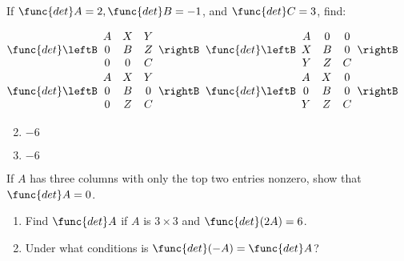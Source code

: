 \begin{multicols}{2}
\begin{ex}
If $\func{det } A = 2, \func{det } B = -1$, and $\func{det } C = 3$, find:

\begin{exenumerate}
\exitem $\func{det} \leftB \begin{array}{ccc}
A & X & Y \\
0 & B & Z \\
0 & 0 & C
\end{array}\rightB$
\exitem $\func{det} \leftB \begin{array}{ccc}
A & 0 & 0 \\
X & B & 0 \\
Y & Z & C
\end{array}\rightB$
\exitem $\func{det} \leftB \begin{array}{ccc}
A & X & Y \\
0 & B & 0 \\
0 & Z & C
\end{array}\rightB$
\exitem $\func{det} \leftB \begin{array}{ccc}
A & X & 0 \\
0 & B & 0 \\
Y & Z & C
\end{array}\rightB$
\end{exenumerate}
\begin{sol}
\begin{enumerate}[label={\alph*.}]
\setcounter{enumi}{1}
\item  $-6$

\setcounter{enumi}{3}
\item  $-6$

\end{enumerate}
\end{sol}
\end{ex}

\begin{ex}
If $A$ has three columns with only the top two entries nonzero, show that $\func{det } A = 0$.
\end{ex}

\begin{ex}
\begin{enumerate}[label={\alph*.}]
\item Find $\func{det } A$ if $A$ is $3 \times 3$ and $\func{det}(2A) = 6$.

\item Under what conditions is $\func{det}(-A) = \func{det } A$?

\end{enumerate}
\end{ex}


\end{multicols}
